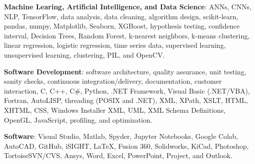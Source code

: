 \documentclass{leresume}
\begin{document}
    \begin{bulletedlist}
		
		\item \textbf{Machine Learing, Artificial Intelligence, and Data Science}: ANNs,
                        CNNs,
                        NLP,
                        TensorFlow,
                        data analysis,
                        data cleaning,
                        algorithm design,
                        scikit-learn,
                        pandas,
                        numpy,
                        Matplotlib,
                        Seaborn,
                        XGBoost,
                        hypothesis testing,
                        confidence interval,
                        Decision Trees,
                        Random Forest,
                        k-nearest neighbors,
                        k-means clustering,
                        linear regression,
                        logistic regression,
                        time series data,
                        supervised learning,
                        unsupervised learning,
                        clustering,
                        PIL,
                        and OpenCV.
                        
		\item \textbf{Software Development}: software architecture,
                        quality assurance,
                        unit testing,
                        sanity checks,
                        continuous integration/delivery,
                        documentation,
                        customer interaction,
                        C,
                        C++,
                        C\#,
                        Python,
                        .NET Framework,
                        Visual Basic (.NET/VBA),
                        Fortran,
                        AutoLISP,
                        threading (POSIX and .NET),
                        XML,
                        XPath,
                        XSLT,
                        HTML,
                        XHTML,
                        CSS,
                        Windows Installer XML,
                        UML,
                        XML Schema Definitions,
                        OpenGL,
                        JavaScript,
                        profiling,
                        and optimization.
                        
		\item \textbf{Software}: Visual Studio,
                        Matlab,
                        Spyder,
                        Jupyter Notebooks,
                        Google Colab,
                        AutoCAD,
                        GitHub,
                        iSIGHT,
                        LaTeX,
                        Fusion 360,
                        Solidworks,
                        KiCad,
                        Photoshop,
                        TortoiseSVN/CVS,
                        Ansys,
                        Word,
                        Excel,
                        PowerPoint,
                        Project,
                        and Outlook.
                        

\end{bulletedlist}
\end{document}
